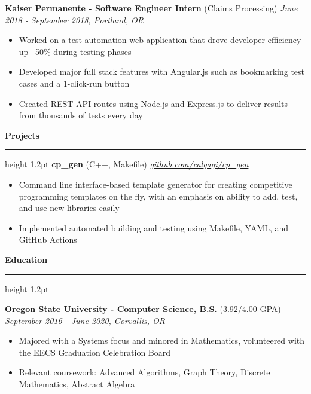 \documentclass{article}
\def\hrulefill{\leavevmode\leaders\hrule height 1.2pt\hfill\kern\z}
\begin{document}
\vskip 0.1in

\noindent \normalsize \textbf{Kaiser Permanente - Software Engineer Intern} \footnotesize (Claims Processing) \hfill \small \textit{June 2018 - September 2018, Portland, OR}
\begin{itemize}
\item Worked on a test automation web application that drove developer efficiency up ~50\% during testing phases
\item Developed major full stack features with Angular.js such as bookmarking test cases and a 1-click-run button
\item Created REST API routes using Node.js and Express.js to deliver results from thousands of tests every day
\end{itemize}

\vskip 0.1in

\noindent \large \textbf{Projects } \hrulefill
\vskip 0.1in
\noindent \normalsize \textbf{cp\_gen} \footnotesize (C++, Makefile) \hfill \small \textit{\href{https://github.com/calgagi/cp_gen}{github.com/calgagi/cp\_gen}}
\begin{itemize}
\item Command line interface-based template generator for creating competitive programming templates on the fly, with an emphasis on ability to add, test, and use new libraries easily
\item Implemented automated building and testing using Makefile, YAML, and GitHub Actions
\end{itemize}

\vskip 0.1in

\noindent \large \textbf{Education } \hrulefill
\vskip 0.1in

\noindent \normalsize \textbf{Oregon State University - Computer Science, B.S.} \footnotesize (3.92/4.00 GPA) \hfill \small \textit{September 2016 - June 2020, Corvallis, OR}
\begin{itemize}
\item Majored with a Systems focus and minored in Mathematics, volunteered with the EECS Graduation Celebration Board
\item Relevant coursework: Advanced Algorithms, Graph Theory, Discrete Mathematics, Abstract Algebra
\end{itemize}
\end{document}
